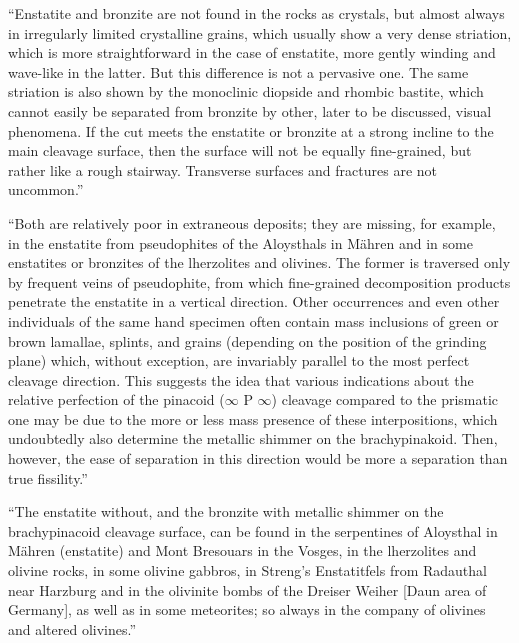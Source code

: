 \documentclass[a4paper, 12pt, oneside]{article}
\begin{document}
``Enstatite and bronzite are not found in the rocks as crystals, but almost always in irregularly limited crystalline grains, which usually show a very dense striation, which is more straightforward in the case of enstatite, more gently winding and wave-like in the latter. But this difference is not a pervasive one. The same striation is also shown by the monoclinic diopside and rhombic bastite, which cannot easily be separated from bronzite by other, later to be discussed, visual phenomena. If the cut meets the enstatite or bronzite at a strong incline to the main cleavage surface, then the surface will not be equally fine-grained, but rather like a rough stairway. Transverse surfaces and fractures are not uncommon.''

``Both are relatively poor in extraneous deposits; they are missing, for example, in the enstatite from pseudophites of the Aloysthals in Mähren and in some enstatites or bronzites of the lherzolites and olivines. The former is traversed only by frequent veins of pseudophite, from which fine-grained decomposition products penetrate the enstatite in a vertical direction. Other occurrences and even other individuals of the same hand specimen often contain mass inclusions of green or brown lamallae, splints, and grains (depending on the position of the grinding plane) which, without exception, are invariably parallel to the most perfect cleavage direction. This suggests the idea that various indications about the relative perfection of the pinacoid ($\infty$ P $\infty$) cleavage compared to the prismatic one may be due to the more or less mass presence of these interpositions, which undoubtedly also determine the metallic shimmer on the brachypinakoid. Then, however, the ease of separation in this direction would be more a separation than true fissility.''

``The enstatite without, and the bronzite with metallic shimmer on the brachypinacoid cleavage surface, can be found in the serpentines of Aloysthal in Mähren (enstatite) and Mont Bresouars in the Vosges, in the lherzolites and olivine rocks, in some olivine gabbros, in Streng's Enstatitfels from Radauthal near Harzburg and in the olivinite bombs of the Dreiser Weiher [Daun area of Germany], as well as in some meteorites; so always in the company of olivines and altered olivines.''
\end{document}
